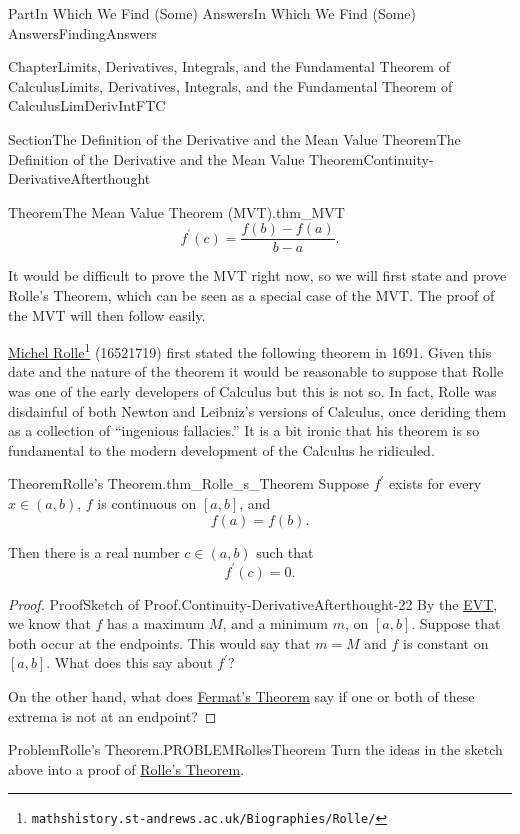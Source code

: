 \documentclass[oneside,10pt,]{book}
\DeclareRobustCommand{\initialismintitle}[1]{\texorpdfstring{#1}{#1}}
\numberwithin{equation}{part}
\begin{document}
\begin{partptx}{Part}{In Which We Find (Some) Answers}{}{In Which We Find (Some) Answers}{}{}{FindingAnswers}
\begin{chapterptx}{Chapter}{Limits, Derivatives, Integrals, and the Fundamental Theorem of Calculus}{}{Limits, Derivatives, Integrals, and the Fundamental Theorem of Calculus}{}{}{LimDerivIntFTC}
\begin{sectionptx}{Section}{The Definition of  the Derivative and the Mean Value Theorem}{}{The Definition of  the Derivative and the Mean Value Theorem}{}{}{Continuity-DerivativeAfterthought}
\begin{theorem}{Theorem}{The Mean Value Theorem (\initialismintitle{MVT}).}{}{thm_MVT}
\begin{equation*}
f^\prime(c)=\frac{f(b)-f(a)}{b-a}.{} 
\end{equation*}
%
\end{theorem}
It would be difficult to prove the MVT right now,  so we will first state and prove Rolle's Theorem, which can be seen as a special case of the MVT. The proof of the MVT will then follow easily.%
\par
\href{https://mathshistory.st-andrews.ac.uk/Biographies/Rolle/}{Michel Rolle}\footnote{\nolinkurl{mathshistory.st-andrews.ac.uk/Biographies/Rolle/}\label{Continuity-DerivativeAfterthought-20-2}} (1652\textendash{}1719) first stated the following theorem in 1691.  Given this date and the nature of the theorem it would be reasonable to suppose that Rolle was one of the early developers of Calculus but this is not so.  In fact, Rolle was disdainful of both Newton  and Leibniz's versions of Calculus, once deriding them as a collection of ``ingenious fallacies.'' It is a bit ironic that his theorem is so fundamental to the modern development of the Calculus he ridiculed.%
\begin{theorem}{Theorem}{Rolle's Theorem.}{}{thm_Rolle_s_Theorem}%
%
Suppose \(f^\prime\) exists for every \(x\in(a,b)\), \(f\) is continuous on \([a,b]\), and%
\begin{equation*}
f(a)=f(b) \text{.}
\end{equation*}
%
\par
Then there is a real number \(c\in(a,b)\) such that%
\begin{equation*}
f^\prime(c)=0 \text{.}
\end{equation*}
%
\end{theorem}
\begin{proof}{Proof}{Sketch of Proof.}{Continuity-DerivativeAfterthought-22}
By the \hyperref[thm_EVT]{EVT}, we know that \(f\) has a maximum \(M\), and a minimum \(m\), on \([a,b]\).  Suppose that both occur at the endpoints.  This would say that \(m=M\) and \(f\) is constant on \([a,b]\).  What does this say about \(f^\prime\)?%
\par
On the other hand, what does \hyperref[thm_FermatsTheorem]{Fermat's Theorem} say if one or both of these extrema is not at an endpoint?%
\end{proof}
\begin{problem}{Problem}{Rolle's Theorem.}{PROBLEMRollesTheorem}%
Turn the ideas in the sketch above into a proof of \hyperref[thm_Rolle_s_Theorem]{Rolle's Theorem}.%

\end{problem}
\end{sectionptx}
\end{chapterptx}
\end{partptx}
\end{document}
